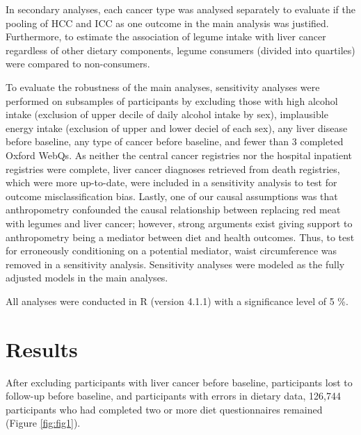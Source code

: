 \documentclass[nutrients,article,submit,moreauthors,pdftex]{Definitions/mdpi}
\begin{document}
In secondary analyses, each cancer type was analysed separately to
evaluate if the pooling of HCC and ICC as one outcome in the main
analysis was justified. Furthermore, to estimate the association of
legume intake with liver cancer regardless of other dietary components,
legume consumers (divided into quartiles) were compared to
non-consumers.

To evaluate the robustness of the main analyses, sensitivity analyses
were performed on subsamples of participants by excluding those with
high alcohol intake (exclusion of upper decile of daily alcohol intake
by sex), implausible energy intake (exclusion of upper and lower deciel
of each sex), any liver disease before baseline, any type of cancer
before baseline, and fewer than 3 completed Oxford WebQs. As neither the
central cancer registries nor the hospital inpatient registries were
complete, liver cancer diagnoses retrieved from death registries, which
were more up-to-date, were included in a sensitivity analysis to test
for outcome misclassification bias. Lastly, one of our causal
assumptions was that anthropometry confounded the causal relationship
between replacing red meat with legumes and liver cancer; however,
strong arguments exist giving support to anthropometry being a mediator
between diet and health outcomes. Thus, to test for erroneously
conditioning on a potential mediator, waist circumference was removed in
a sensitivity analysis. Sensitivity analyses were modeled as the fully
adjusted models in the main analyses.

All analyses were conducted in R (version 4.1.1) with a significance
level of 5 \%.

\hypertarget{sec3}{%
\section{Results}\label{sec3}}

After excluding participants with liver cancer before baseline,
participants lost to follow-up before baseline, and participants with
errors in dietary data, 126,744 participants who had completed two or
more diet questionnaires remained (Figure \ref{fig:fig1}).
\end{document}
